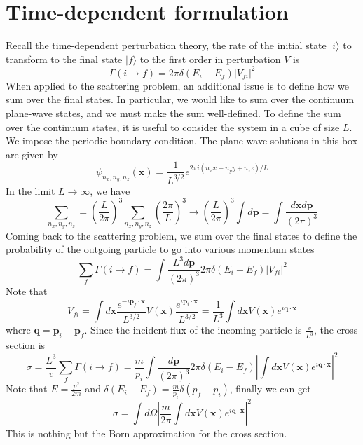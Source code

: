 \section{Time-dependent formulation}
Recall the time-dependent perturbation theory, the rate of the initial state $|i\rangle$ to transform to the final state $|f\rangle$ to the first order in perturbation $V$ is
\[\Gamma(i \to f) = 2\pi \delta(E_i-E_f) |V_{fi}|^2\]
When applied to the scattering problem, an additional issue is to define how we sum over the final states. 
In particular, we would like to sum over the continuum plane-wave states, and we must make the sum well-defined.
To define the sum over the continuum states, it is useful to consider the system in a cube of size $L$. 
We impose the periodic boundary condition. The plane-wave solutions in this box are given by
\[\psi_{n_x,n_y,n_z}(\bm{x}) = \frac{1}{L^{3/2}} e^{2\pi i(n_x x + n_y y + n_z z)/L}\]
In the limit $L \to \infty$, we have
\[\sum_{n_x,n_y,n_z} = \left( \frac{L}{2\pi}\right)^3 \sum_{n_x,n_y,n_z} \left( \frac{2\pi}{L}\right)^3 \to \left( \frac{L}{2\pi}\right)^3 \int d\bm{p} = \int \frac{d\bm{x}d\bm{p}}{(2\pi)^3}\]
Coming back to the scattering problem, we sum over the final states to define the probability of the outgoing particle to go into various momentum states
\[\sum_{f} \Gamma(i \to f) = \int \frac{L^3 d\bm{p}}{(2\pi)^3} 2\pi \delta(E_i-E_f) |V_{fi}|^2\]
Note that
\[V_{fi} = \int d\bm{x} \frac{e^{-i\bm{p}_f \cdot \bm{x}}}{L^{3/2}} V(\bm{x}) \frac{e^{i\bm{p}_i \cdot \bm{x}}}{L^{3/2}}  = \frac{1}{L^3} \int d\bm{x} V(\bm{x}) e^{i\bm{q}\cdot\bm{x}}\]
where $\bm{q} = \bm{p}_i - \bm{p}_f$.
Since the incident flux of the incoming particle is $\frac{v}{L^3}$, the cross section is
\[\sigma = \frac{L^3}{v} \sum_{f} \Gamma(i \to f) =  \frac{m}{p_i} \int \frac{ d\bm{p}}{(2\pi)^3} 2\pi \delta(E_i-E_f) \left |\int d\bm{x} V(\bm{x}) e^{i\bm{q}\cdot\bm{x}} \right|^2\]
Note that $E = \frac{p^2}{2m}$ and $\delta(E_i-E_f) = \frac{m}{p_i} \delta(p_f-p_i)$, finally we can get
\[\sigma = \int d\Omega \left | \frac{m}{2\pi} \int d\bm{x} V(\bm{x}) e^{i\bm{q}\cdot\bm{x}} \right|^2\]
This is nothing but the Born approximation for the cross section.
